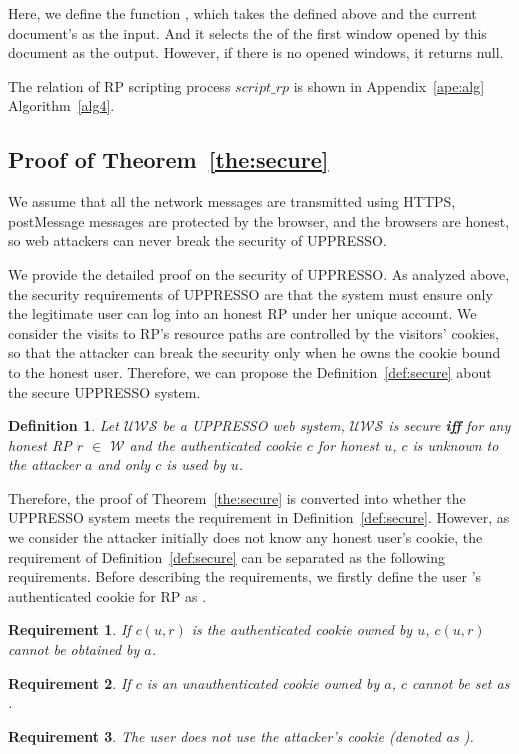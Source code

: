 Here, we define the function , which takes the  defined above and the current document's  as the input. And it selects the  of the first window opened by this document as the output. However, if there is no opened windows, it returns  null.

The relation of RP scripting process $script\_rp$ is shown in Appendix~\ref{ape:alg} Algorithm~\ref{alg4}.



\subsection{Proof of Theorem~\ref{the:secure}}


\newtheorem{redef}{Definition}
\newtheorem{req}{Requirement}
\newtheorem{relemma}{Lemma}

We assume that all the network messages are transmitted using HTTPS, postMessage messages are protected by the browser, and the browsers are  honest, so web attackers can never break the security of UPPRESSO.

We provide the detailed proof on the security of UPPRESSO. As analyzed above, the security requirements of UPPRESSO are that the system must ensure only the legitimate user can log into an honest RP under her unique account. We consider the visits to RP's resource paths are controlled by the visitors' cookies, so that the attacker can break the security only when he owns the cookie bound to the honest user. Therefore, we can propose the Definition~\ref{def:secure} about the secure UPPRESSO system.
\begin{redef}
Let $\mathcal{UWS}$ be a UPPRESSO web system, $\mathcal{UWS}$ is secure \textbf{iff} for any honest RP $r$ $\in $ $\mathcal{W}$ and  the authenticated cookie $c$ for honest $u$,  $c$ is unknown to the attacker $a$ and only $c$ is used by $u$.
\end{redef}
Therefore, the proof of Theorem~\ref{the:secure} is converted into whether the UPPRESSO system meets the requirement in Definition~\ref{def:secure}. However, as we consider the attacker initially does not know any honest user's cookie, the requirement of Definition~\ref{def:secure} can be separated as the following requirements. Before describing the requirements, we firstly define the user 's authenticated cookie for RP  as .
\begin{req}
If $c(u,r)$ is the authenticated cookie owned by $u$, $c(u,r)$ cannot be obtained by $a$.
\label{req:cookie1}
\end{req}
\begin{req}
If $c$ is an unauthenticated cookie owned by $a$, $c$ cannot be set as .
\label{req:cookie2}
\end{req}
\begin{req}
The user  does not use the attacker's cookie (denoted as ).
\label{req:cookie3}
\end{req}


